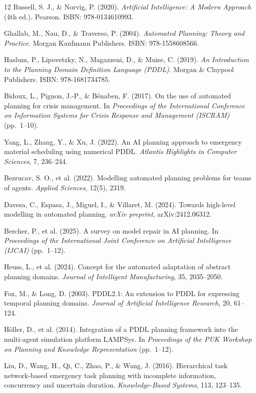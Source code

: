 \documentclass[conference]{IEEEtran}
\begin{document}
    \begin{thebibliography}{12}
    Russell, S. J., \& Norvig, P. (2020). \textit{Artificial Intelligence: A Modern Approach} (4th ed.). Pearson. ISBN: 978-0134610993.

    Ghallab, M., Nau, D., \& Traverso, P. (2004). \textit{Automated Planning: Theory and Practice}. Morgan Kaufmann Publishers. ISBN: 978-1558608566.

    Haslum, P., Lipovetzky, N., Magazzeni, D., \& Muise, C. (2019). \textit{An Introduction to the Planning Domain Definition Language (PDDL)}. Morgan \& Claypool Publishers. ISBN: 978-1681734785.

    Bidoux, L., Pignon, J.-P., \& Bénaben, F. (2017). On the use of automated planning for crisis management. In \textit{Proceedings of the International Conference on Information Systems for Crisis Response and Management (ISCRAM)} (pp.\ 1--10).

    Yang, L., Zhang, Y., \& Xu, J. (2022). An AI planning approach to emergency material scheduling using numerical PDDL. \textit{Atlantis Highlights in Computer Sciences}, 7, 236--244.

    Bezrucav, S. O., et al. (2022). Modelling automated planning problems for teams of agents. \textit{Applied Sciences}, 12(5), 2319.

    Davesa, C., Espasa, J., Miguel, I., \& Villaret, M. (2024). Towards high-level modelling in automated planning. \textit{arXiv preprint}, arXiv:2412.06312.

    Bercher, P., et al. (2025). A survey on model repair in AI planning. In \textit{Proceedings of the International Joint Conference on Artificial Intelligence (IJCAI)} (pp.\ 1--12).

    Heuss, L., et al. (2024). Concept for the automated adaptation of abstract planning domains. \textit{Journal of Intelligent Manufacturing}, 35, 2035--2050.

    Fox, M., \& Long, D. (2003). PDDL2.1: An extension to PDDL for expressing temporal planning domains. \textit{Journal of Artificial Intelligence Research}, 20, 61--124.

    Höller, D., et al. (2014). Integration of a PDDL planning framework into the multi-agent simulation platform LAMPSys. In \textit{Proceedings of the PUK Workshop on Planning and Knowledge Representation} (pp.\ 1--12).

    Liu, D., Wang, H., Qi, C., Zhao, P., \& Wang, J. (2016). Hierarchical task network-based emergency task planning with incomplete information, concurrency and uncertain duration. \textit{Knowledge-Based Systems}, 113, 123--135.
    \end{thebibliography}

    
\end{document}
